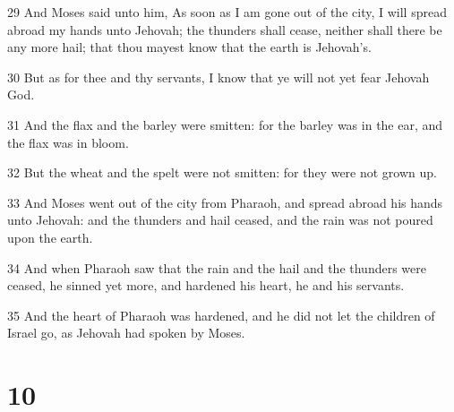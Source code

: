 \par 29 And Moses said unto him, As soon as I am gone out of the city, I will spread abroad my hands unto Jehovah; the thunders shall cease, neither shall there be any more hail; that thou mayest know that the earth is Jehovah's.
\par 30 But as for thee and thy servants, I know that ye will not yet fear Jehovah God.
\par 31 And the flax and the barley were smitten: for the barley was in the ear, and the flax was in bloom.
\par 32 But the wheat and the spelt were not smitten: for they were not grown up.
\par 33 And Moses went out of the city from Pharaoh, and spread abroad his hands unto Jehovah: and the thunders and hail ceased, and the rain was not poured upon the earth.
\par 34 And when Pharaoh saw that the rain and the hail and the thunders were ceased, he sinned yet more, and hardened his heart, he and his servants.
\par 35 And the heart of Pharaoh was hardened, and he did not let the children of Israel go, as Jehovah had spoken by Moses.

\chapter{10}

